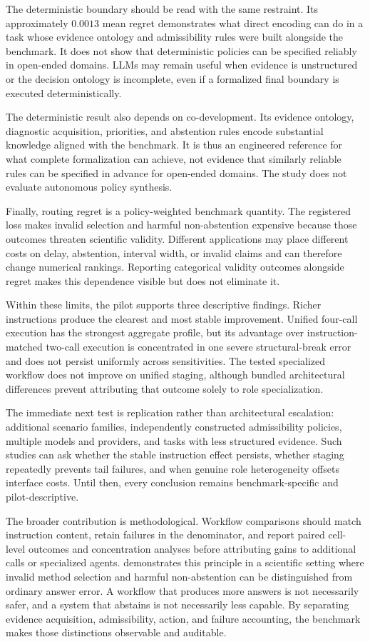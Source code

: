 The deterministic boundary should be read with the same restraint.  Its
approximately \(0.0013\) mean regret demonstrates what direct encoding can do
in a task whose evidence ontology and admissibility rules were built alongside
the benchmark.  It does not show that deterministic policies can be specified
reliably in open-ended domains.  LLMs may remain useful when evidence is
unstructured or the decision ontology is incomplete, even if a formalized
final boundary is executed deterministically.

The deterministic result also depends on co-development.  Its evidence
ontology, diagnostic acquisition, priorities, and abstention rules encode
substantial knowledge aligned with the benchmark.  It is thus an engineered
reference for what complete formalization can achieve, not evidence that
similarly reliable rules can be specified in advance for open-ended domains.
The study does not evaluate autonomous policy synthesis.

Finally, routing regret is a policy-weighted benchmark quantity.  The
registered loss makes invalid selection and harmful non-abstention expensive
because those outcomes threaten scientific validity.  Different applications
may place different costs on delay, abstention, interval width, or invalid
claims and can therefore change numerical rankings.  Reporting categorical
validity outcomes alongside regret makes this dependence visible but does not
eliminate it.

Within these limits, the pilot supports three descriptive findings.  Richer
instructions produce the clearest and most stable improvement.  Unified
four-call execution has the strongest aggregate profile, but its advantage over
instruction-matched two-call execution is concentrated in one severe
structural-break error and does not persist uniformly across sensitivities.
The tested specialized workflow does not improve on unified staging, although
bundled architectural differences prevent attributing that outcome solely to
role specialization.

The immediate next test is replication rather than architectural escalation:
additional scenario families, independently constructed admissibility
policies, multiple models and providers, and tasks with less structured
evidence.  Such studies can ask whether the stable instruction effect
persists, whether staging repeatedly prevents tail failures, and when genuine
role heterogeneity offsets interface costs.  Until then, every conclusion
remains benchmark-specific and pilot-descriptive.

The broader contribution is methodological.  Workflow comparisons should match
instruction content, retain failures in the denominator, and report paired
cell-level outcomes and concentration analyses before attributing gains to
additional calls or specialized agents.  \ERI{} demonstrates this principle in a
scientific setting where invalid method selection and harmful non-abstention
can be distinguished from ordinary answer error.  A workflow that produces more
answers is not necessarily safer, and a system that abstains is not
necessarily less capable.  By separating evidence acquisition, admissibility,
action, and failure accounting, the benchmark makes those distinctions
observable and auditable.
